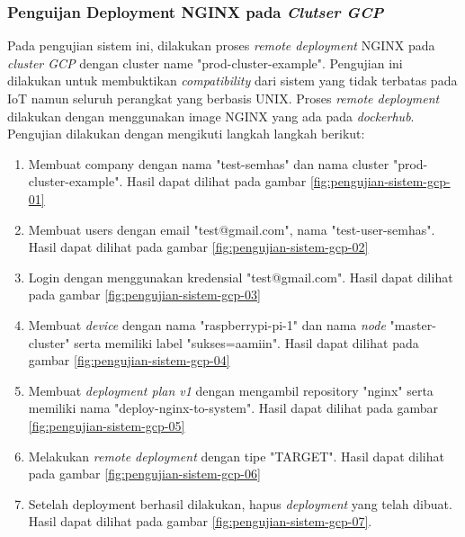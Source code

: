 \subsubsection{Penguijan Deployment NGINX pada \textit{Clutser GCP}}

Pada pengujian sistem ini, dilakukan proses \textit{remote deployment} NGINX pada \textit{cluster GCP} dengan cluster name "prod-cluster-example". Pengujian ini dilakukan untuk membuktikan \textit{compatibility} dari sistem yang tidak terbatas pada IoT namun seluruh perangkat yang berbasis UNIX. Proses \textit{remote deployment} dilakukan dengan menggunakan image NGINX yang ada pada \textit{dockerhub}. Pengujian dilakukan dengan mengikuti langkah langkah berikut:
\begin{enumerate}
  \item Membuat company dengan nama "test-semhas" dan nama cluster "prod-cluster-example". Hasil dapat dilihat pada gambar \ref{fig:pengujian-sistem-gcp-01}
  \item Membuat users dengan email "test@gmail.com", nama "test-user-semhas". Hasil dapat dilihat pada gambar \ref{fig:pengujian-sistem-gcp-02}
  \item Login dengan menggunakan kredensial "test@gmail.com". Hasil dapat dilihat pada gambar \ref{fig:pengujian-sistem-gcp-03}
  \item Membuat \textit{device} dengan nama "raspberrypi-pi-1" dan nama \textit{node} "master-cluster" serta memiliki label "sukses=aamiin". Hasil dapat dilihat pada gambar \ref{fig:pengujian-sistem-gcp-04}
  \item Membuat \textit{deployment plan v1} dengan mengambil repository "nginx" serta memiliki nama "deploy-nginx-to-system". Hasil dapat dilihat pada gambar \ref{fig:pengujian-sistem-gcp-05}
  \item Melakukan \textit{remote deployment} dengan tipe "TARGET". Hasil dapat dilihat pada gambar \ref{fig:pengujian-sistem-gcp-06}
  \item Setelah deployment berhasil dilakukan, hapus \textit{deployment} yang telah dibuat. Hasil dapat dilihat pada gambar \ref{fig:pengujian-sistem-gcp-07}.
\end{enumerate}